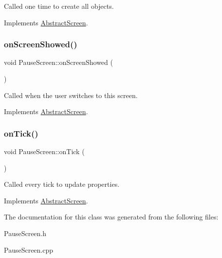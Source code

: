 Called one time to create all objects. 



Implements \mbox{\hyperlink{class_abstract_screen_a7ab389bd33f4824d3d353b5a9e1616de}{Abstract\+Screen}}.

\mbox{\label{class_pause_screen_a2eb2b032a3c3e833beb505c2df12396b}} 
\subsubsection{\texorpdfstring{on\+Screen\+Showed()}{onScreenShowed()}}
{\footnotesize\ttfamily void Pause\+Screen\+::on\+Screen\+Showed (\begin{DoxyParamCaption}{ }\end{DoxyParamCaption})\hspace{0.3cm}{\ttfamily [virtual]}}



Called when the user switches to this screen. 



Implements \mbox{\hyperlink{class_abstract_screen_a219687a34e6aed15a9eaf0d4414d1783}{Abstract\+Screen}}.

\mbox{\label{class_pause_screen_a89ef5189bdc9acfae5eedbff2cf4b458}} 
\subsubsection{\texorpdfstring{on\+Tick()}{onTick()}}
{\footnotesize\ttfamily void Pause\+Screen\+::on\+Tick (\begin{DoxyParamCaption}{ }\end{DoxyParamCaption})\hspace{0.3cm}{\ttfamily [virtual]}}



Called every tick to update properties. 



Implements \mbox{\hyperlink{class_abstract_screen_a3861213630fd23d4a3ff392191614ec2}{Abstract\+Screen}}.



The documentation for this class was generated from the following files\+:\begin{DoxyCompactItemize}
\item 
Pause\+Screen.\+h\item 
Pause\+Screen.\+cpp\end{DoxyCompactItemize}
